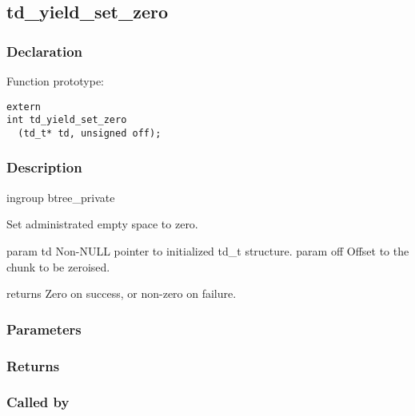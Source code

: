 
\newpage
\subsection{td\_yield\_set\_zero}
\subsubsection{Declaration} Function prototype:

\begin{verbatim}
extern
int td_yield_set_zero
  (td_t* td, unsigned off);
\end{verbatim}

\subsubsection{Description}


 ingroup btree\_private

 Set administrated empty space to zero.

 param td Non-NULL pointer to initialized td\_t structure.
 param off Offset to the chunk to be zeroised.

 returns Zero on success, or non-zero on failure.
 

\subsubsection{Parameters}
\subsubsection{Returns}
\subsubsection{Called by}
